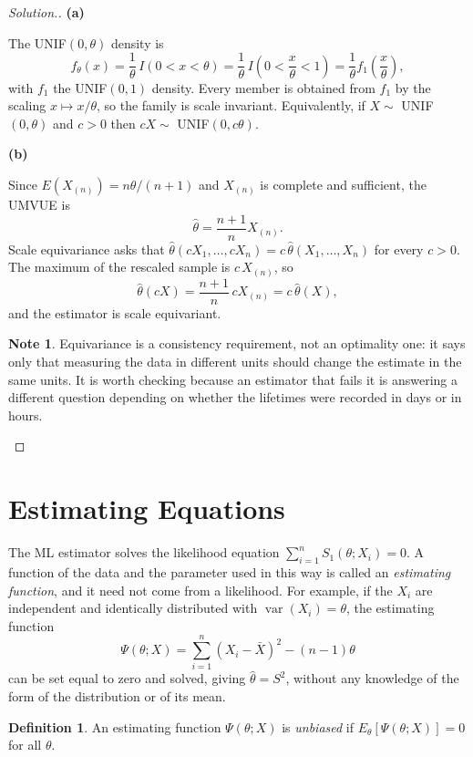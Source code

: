 \documentclass[12pt,a4paper]{report}
\theoremstyle{definition}
\newtheorem{defn}[thm]{Definition}
\newtheorem*{note}{Note}
\newcommand{\subhead}[1]{%
  \par\medskip\noindent\textbf{#1}\par\nobreak\smallskip}
\DeclareMathOperator{\var}{var}
\newenvironment{solution}
  {\renewcommand{\qedsymbol}{}\begin{proof}[\textit{Solution}.]}
  {\end{proof}}
\begin{document}
\begin{solution}
\subhead{(a)}
The UNIF$(0,\theta)$ density is
\[f_{\theta}(x) = \frac{1}{\theta}\,I\left(0<x<\theta\right)
= \frac{1}{\theta}\,I\left(0<\frac{x}{\theta}<1\right)
= \frac{1}{\theta}f_1\!\left(\frac{x}{\theta}\right),\]
with $f_1$ the UNIF$(0,1)$ density. Every member is obtained from $f_1$ by the
scaling $x\mapsto x/\theta$, so the family is scale invariant. Equivalently, if
$X\sim$ UNIF$(0,\theta)$ and $c>0$ then $cX\sim$ UNIF$(0,c\theta)$.

\subhead{(b)}
Since $E\left(X_{(n)}\right)=n\theta/(n+1)$ and $X_{(n)}$ is complete and
sufficient, the UMVUE is
\[\widehat{\theta} = \frac{n+1}{n}X_{(n)} .\]
Scale equivariance asks that $\widehat{\theta}(cX_1,\dots,cX_n) = c\,\widehat{\theta}(X_1,\dots,X_n)$
for every $c>0$. The maximum of the rescaled sample is $c\,X_{(n)}$, so
\[\widehat{\theta}(cX) = \frac{n+1}{n}\,cX_{(n)} = c\,\widehat{\theta}(X),\]
and the estimator is scale equivariant.

\begin{note}
Equivariance is a consistency requirement, not an optimality one: it says only
that measuring the data in different units should change the estimate in the
same units. It is worth checking because an estimator that fails it is
answering a different question depending on whether the lifetimes were recorded
in days or in hours.
\end{note}
\end{solution}

\section{Estimating Equations}

The ML estimator solves the likelihood equation $\sum_{i=1}^n S_1(\theta; X_i) = 0$. A
function of the data and the parameter used in this way is called an
\emph{estimating function}, and it need not come from a likelihood. For example, if
the $X_i$ are independent and identically distributed with $\var(X_i) = \theta$, the
estimating function
\[\Psi(\theta; X) = \sum^n_{i = 1}\left(X_i - \bar X\right)^2 - (n - 1)\theta\]
can be set equal to zero and solved, giving $\hat\theta = S^2$, without any knowledge
of the form of the distribution or of its mean.

\begin{defn}
\label{def:unbiasedee}
An estimating function $\Psi(\theta; X)$ is \emph{unbiased} if
$E_\theta\left[\Psi(\theta; X)\right] = 0$ for all $\theta$.
\end{defn}
\end{document}
